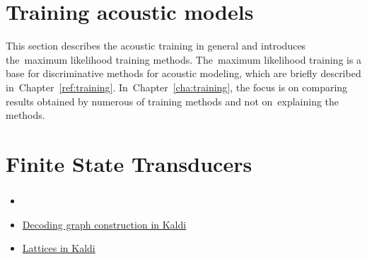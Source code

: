 


\section{Training acoustic models} 
\label{sec:train_ml}

This section describes the acoustic training in general and introduces the~maximum likelihood training methods.
The~maximum likelihood training is a base for discriminative methods for acoustic modeling, which are briefly
described in~Chapter~\ref{ref:training}.
In~Chapter~\ref{cha:training}, the focus is on comparing results obtained by numerous of training methods
and not on~explaining the methods.










\section{Finite State Transducers} 
\label{sec:fst}



\subsubsection*{} %

\begin{itemize}
    \item {}
    \item \href{http://kaldi.sourceforge.net/graph.html} {Decoding graph construction in Kaldi}
    \item \href{http://kaldi.sourceforge.net/lattices.html} {Lattices in Kaldi}
\end{itemize}

